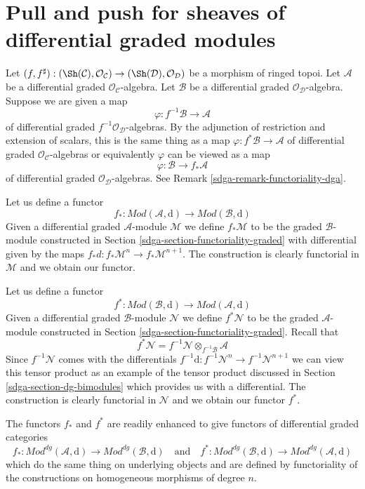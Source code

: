 \section{Pull and push for sheaves of differential graded modules}
\label{sdga-section-functoriality-dg}
Let $(f, f^\sharp) : (\Sh(\mathcal{C}), \mathcal{O}_\mathcal{C})
\to (\Sh(\mathcal{D}), \mathcal{O}_\mathcal{D})$
be a morphism of ringed topoi. Let $\mathcal{A}$ be a differential
graded $\mathcal{O}_\mathcal{C}$-algebra. Let $\mathcal{B}$ be a
differential graded $\mathcal{O}_\mathcal{D}$-algebra.
Suppose we are given a map
$$
\varphi : f^{-1}\mathcal{B} \to \mathcal{A}
$$
of differential graded $f^{-1}\mathcal{O}_\mathcal{D}$-algebras.
By the adjunction of restriction and extension of scalars, this
is the same thing as a map $\varphi : f^*\mathcal{B} \to \mathcal{A}$
of differential graded $\mathcal{O}_\mathcal{C}$-algebras or equivalently
$\varphi$ can be viewed as a map
$$
\varphi : \mathcal{B} \to f_*\mathcal{A}
$$
of differential graded $\mathcal{O}_\mathcal{D}$-algebras.
See Remark \ref{sdga-remark-functoriality-dga}.

\medskip\noindent
Let us define a functor
$$
f_* :
\textit{Mod}(\mathcal{A}, \text{d})
\longrightarrow
\textit{Mod}(\mathcal{B}, \text{d})
$$
Given a differential graded $\mathcal{A}$-module $\mathcal{M}$ we define
$f_*\mathcal{M}$ to be the graded $\mathcal{B}$-module constructed
in Section \ref{sdga-section-functoriality-graded} with differential
given by the maps $f_*d : f_*\mathcal{M}^n \to f_*\mathcal{M}^{n + 1}$.
The construction is clearly functorial in
$\mathcal{M}$ and we obtain our functor.

\medskip\noindent
Let us define a functor
$$
f^* :
\textit{Mod}(\mathcal{B}, \text{d})
\longrightarrow
\textit{Mod}(\mathcal{A}, \text{d})
$$
Given a differential graded $\mathcal{B}$-module $\mathcal{N}$
we define $f^*\mathcal{N}$ to be the graded $\mathcal{A}$-module
constructed in Section \ref{sdga-section-functoriality-graded}. Recall
that
$$
f^*\mathcal{N} = f^{-1}\mathcal{N} \otimes_{f^{-1}\mathcal{B}} \mathcal{A}
$$
Since $f^{-1}\mathcal{N}$ comes with the differentials
$f^{-1}\text{d} : f^{-1}\mathcal{N}^n \to f^{-1}\mathcal{N}^{n + 1}$
we can view this tensor product as an example of the
tensor product discussed in Section \ref{sdga-section-dg-bimodules}
which provides us with a differential.
The construction is clearly functorial in
$\mathcal{N}$ and we obtain our functor $f^*$.

\medskip\noindent
The functors $f_*$ and $f^*$ are readily enhanced to give
functors of differential graded categories
$$
f_* :
\textit{Mod}^{dg}(\mathcal{A}, \text{d})
\longrightarrow
\textit{Mod}^{dg}(\mathcal{B}, \text{d})
\quad\text{and}\quad
f^* :
\textit{Mod}^{dg}(\mathcal{B}, \text{d})
\longrightarrow
\textit{Mod}^{dg}(\mathcal{A}, \text{d})
$$
which do the same thing on underlying objects and are defined
by functoriality of the constructions on homogeneous morphisms
of degree $n$.

